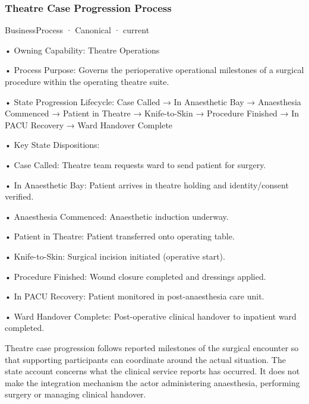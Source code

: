 \subsubsection{Theatre Case Progression Process}

\label{element:8ad97120b5b54a31a64a4522e6bc9fd1}
{\small BusinessProcess · Canonical · current}\par

•
Owning Capability: Theatre Operations



•
Process Purpose: Governs the perioperative operational milestones of a surgical procedure within the operating theatre suite.



•
State Progression Lifecycle: Case Called → In Anaesthetic Bay → Anaesthesia Commenced → Patient in Theatre → Knife-to-Skin → Procedure Finished → In PACU Recovery → Ward Handover Complete



•
Key State Dispositions:



•
Case Called: Theatre team requests ward to send patient for surgery.



•
In Anaesthetic Bay: Patient arrives in theatre holding and identity/consent verified.



•
Anaesthesia Commenced: Anaesthetic induction underway.



•
Patient in Theatre: Patient transferred onto operating table.



•
Knife-to-Skin: Surgical incision initiated (operative start).



•
Procedure Finished: Wound closure completed and dressings applied.



•
In PACU Recovery: Patient monitored in post-anaesthesia care unit.



•
Ward Handover Complete: Post-operative clinical handover to inpatient ward completed.



Theatre case progression follows reported milestones of the surgical encounter so that supporting participants can coordinate around the actual situation. The state account concerns what the clinical service reports has occurred. It does not make the integration mechanism the actor administering anaesthesia, performing surgery or managing clinical handover.


